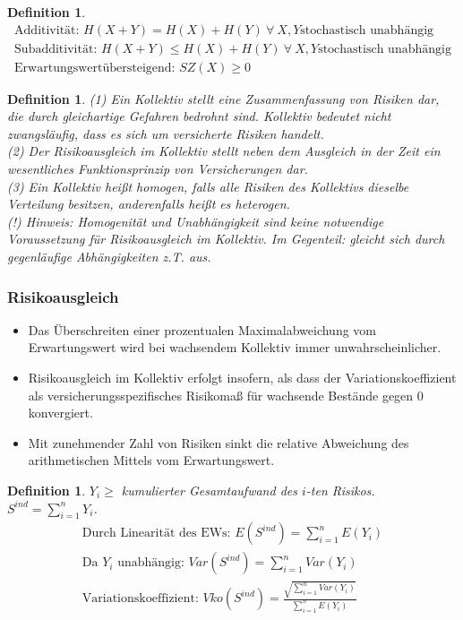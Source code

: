 \documentclass[12pt]{report}
\theoremstyle{dotless}
\newtheorem{defn}[thm]{Definition}
\theoremstyle{definition}
\begin{document}
\begin{defn}
\begin{align}
	\text{Additivität: } H(X+Y)=H(X)+H(Y) \ \forall \ X,Y \text{stochastisch unabhängig} \\
	\text{Subadditivität: } H(X+Y) \leq H(X)+H(Y) \ \forall \ X,Y \text{stochastisch unabhängig} \\
	\text{Erwartungswertübersteigend: } SZ(X) \geq 0
\end{align}
\end{defn}


\begin{defn}
	(1) Ein Kollektiv stellt eine Zusammenfassung von Risiken dar, die durch gleichartige Gefahren bedrohnt sind. Kollektiv bedeutet nicht zwangsläufig, dass es sich um \textit{versicherte Risiken} handelt. \\
	(2) Der Risikoausgleich im Kollektiv stellt neben dem Ausgleich in der Zeit ein wesentliches Funktionsprinzip von Versicherungen dar. \\
	(3) Ein Kollektiv hei{\ss}t homogen, falls alle Risiken des Kollektivs dieselbe Verteilung besitzen, anderenfalls hei{\ss}t es heterogen. \\
	(!) Hinweis: Homogenität und Unabhängigkeit sind keine notwendige Voraussetzung für Risikoausgleich im Kollektiv. Im Gegenteil: gleicht sich durch gegenläufige Abhängigkeiten z.T. aus.
\end{defn}

\subsubsection{Risikoausgleich}
\begin{itemize}
	\item Das Überschreiten einer prozentualen Maximalabweichung vom Erwartungswert wird bei wachsendem Kollektiv immer unwahrscheinlicher.
	\item Risikoausgleich im Kollektiv erfolgt insofern, als dass der Variationskoeffizient als versicherungsspezifisches Risikoma{\ss} für wachsende Bestände gegen 0 konvergiert.
	\item Mit zunehmender Zahl von Risiken sinkt die relative Abweichung des arithmetischen Mittels vom Erwartungswert.
\end{itemize}

\begin{defn}
$Y_i\geq$ kumulierter Gesamtaufwand des $i$-ten Risikos. $S^{ind}=\sum_{i=1}^nY_i $.
	\begin{align}
		\text{Durch Linearität des EWs: } E(S^{ind})=\sum_{i=1}^n E(Y_i) \\
		\text{Da } Y_i \text{ unabhängig: } Var(S^{ind})=\sum_{i=1}^n Var(Y_i) \\
		\text{Variationskoeffizient: } Vko(S^{ind})=\frac{\sqrt{\sum_{i=1}^nVar(Y_i)}}{\sum_{i=1}^nE(Y_i)}
	\end{align}
\end{defn}
\end{document}
